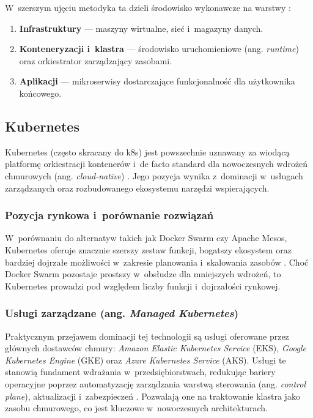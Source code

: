 W~szerszym ujęciu metodyka ta dzieli środowisko wykonawcze na warstwy \cite{Kratzke2016CloudNativeReferenceModel}:
\begin{enumerate}
    \item \textbf{Infrastruktury} --- maszyny wirtualne, sieć i~magazyny danych.
    \item \textbf{Konteneryzacji i~klastra} --- środowisko uruchomieniowe (ang. \textit{runtime}) oraz orkiestrator zarządzający zasobami.
    \item \textbf{Aplikacji} --- mikroserwisy dostarczające funkcjonalność dla użytkownika końcowego.
\end{enumerate}


\subsection{Kubernetes}

Kubernetes (często skracany do k8s) jest powszechnie uznawany za wiodącą platformę orkiestracji kontenerów i~de facto standard dla nowoczesnych wdrożeń chmurowych (ang. \textit{cloud-native}) \cite{Mondal2023KubernetesAutoscaling}. Jego pozycja wynika z~dominacji w~usługach zarządzanych oraz rozbudowanego ekosystemu narzędzi wspierających.

\subsubsection{Pozycja rynkowa i~porównanie rozwiązań}
W~porównaniu do alternatyw takich jak Docker Swarm czy Apache Mesos, Kubernetes oferuje znacznie szerszy zestaw funkcji, bogatszy ekosystem oraz bardziej dojrzałe możliwości w~zakresie planowania i~skalowania zasobów \cite{Alonso2023MultiCloudNative}. Choć Docker Swarm pozostaje prostszy w~obsłudze dla mniejszych wdrożeń, to Kubernetes prowadzi pod względem liczby funkcji i~dojrzałości rynkowej.

\subsubsection{Usługi zarządzane (ang. \textit{Managed Kubernetes})}
Praktycznym przejawem dominacji tej technologii są usługi oferowane przez głównych dostawców chmury: \textit{Amazon Elastic Kubernetes Service} (EKS), \textit{Google Kubernetes Engine} (GKE) oraz \textit{Azure Kubernetes Service} (AKS). Usługi te stanowią fundament wdrażania w~przedsiębiorstwach, redukując bariery operacyjne poprzez automatyzację zarządzania warstwą sterowania (ang. \textit{control plane}), aktualizacji i~zabezpieczeń \cite{Mondal2023KubernetesAutoscaling}. Pozwalają one na traktowanie klastra jako zasobu chmurowego, co jest kluczowe w~nowoczesnych architekturach.

